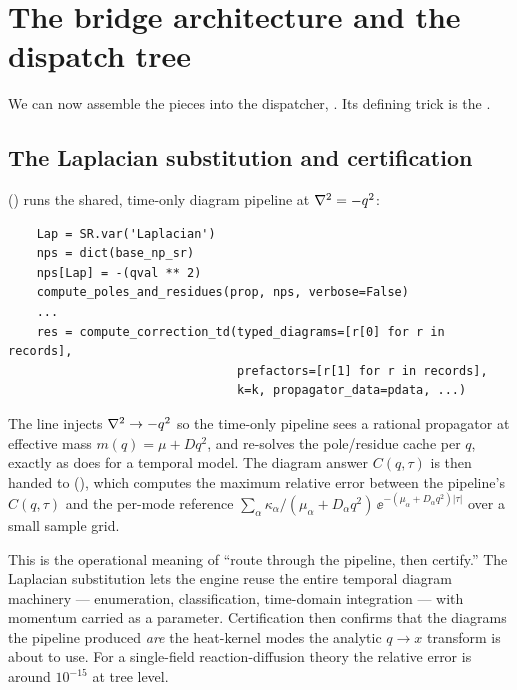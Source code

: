 \section{The bridge architecture and the dispatch tree}\label{sec:dispatch}

We can now assemble the pieces into the dispatcher,
. Its defining trick is the .

\subsection{The Laplacian substitution and certification}

 () runs the shared,
time-only diagram pipeline at $\nabla^2=-q^{2}$:

\begin{lstlisting}
    Lap = SR.var('Laplacian')
    nps = dict(base_np_sr)
    nps[Lap] = -(qval ** 2)
    compute_poles_and_residues(prop, nps, verbose=False)
    ...
    res = compute_correction_td(typed_diagrams=[r[0] for r in records],
                                prefactors=[r[1] for r in records],
                                k=k, propagator_data=pdata, ...)
\end{lstlisting}

The line  injects $\nabla^2\to-q^{2}$ so the time-only
pipeline sees a rational propagator at effective mass $m(q)=\mu+Dq^{2}$, and
 re-solves the pole/residue cache per $q$,
exactly as  does for a temporal model. The diagram answer
$C(q,\tau)$ is then handed to 
(), which computes the maximum relative error
between the pipeline's $C(q,\tau)$ and the per-mode reference
$\sum_{\alpha}\kappa_{\alpha}/(\mu_{\alpha}+D_{\alpha}q^{2})\,
\ee^{-(\mu_{\alpha}+D_{\alpha}q^{2})|\tau|}$ over a small sample grid.

\begin{note}
This is the operational meaning of ``route through the pipeline, then
certify.'' The Laplacian substitution lets the engine reuse the entire temporal
diagram machinery --- enumeration, classification, time-domain integration ---
with momentum carried as a parameter. Certification then confirms that the
diagrams the pipeline produced \emph{are} the heat-kernel modes the analytic
$q\to x$ transform is about to use. For a single-field reaction-diffusion theory
the relative error is around $10^{-15}$ at tree level.
\end{note}

